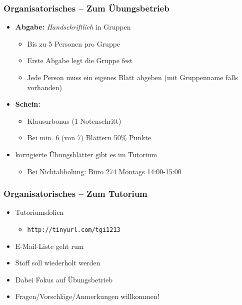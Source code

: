 \begin{frame}
	\frametitle{Organisatorisches -- Zum Übungsbetrieb}
	\begin{itemize}
		\item \textbf{Abgabe:} \emph{Handschriftlich} in Gruppen
		\begin{itemize}
			\item Bis zu 5 Personen pro Gruppe
			\item Erste Abgabe legt die Gruppe fest
			\item Jede Person muss ein eigenes Blatt abgeben (mit Gruppenname falls vorhanden)
		\end{itemize}
		\item \textbf{Schein:} 
		\begin{itemize}
			\item Klausurbonus (1 Notenschritt)
			\item Bei min. 6 (von 7) Blättern 50\% Punkte
		\end{itemize}
		\item korrigierte Übungsblätter gibt es im Tutorium
		\begin{itemize}
			\item Bei Nichtabholung: Büro 274 Montags 14:00-15:00
		\end{itemize}
	\end{itemize}
\end{frame}
\begin{frame}
	\frametitle{Organisatorisches -- Zum Tutorium}
	\begin{itemize}
	\item Tutoriumsfolien
		\begin{itemize}
			\item \texttt{http://tinyurl.com/tgi1213}
		\end{itemize}
		\item E-Mail-Liste geht rum
		\item Stoff soll wiederholt werden
		\item Dabei Fokus auf Übungsbetrieb
		\item Fragen/Vorschläge/Anmerkungen willkommen!
	\end{itemize}
\end{frame}


